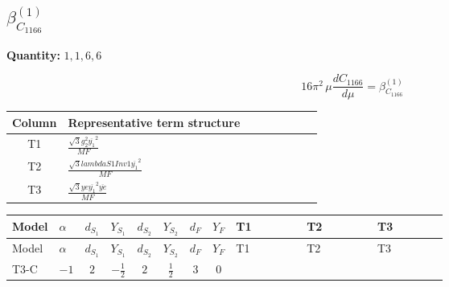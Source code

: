 \documentclass[8pt]{article}
\begin{document}
\begin{landscape}
\section*{$\beta_{C_{1166}}^{(1)}$}
\noindent\textbf{Quantity: }$\mathrm{1,1,6,6}$\par\smallskip
\[16\pi^2\,\mu\frac{d C_{1166}}{d\mu}=\beta_{C_{1166}}^{(1)}\]
\begin{center}
\begin{tabular}{@{}c >{\raggedright\arraybackslash}p{0.82\linewidth}@{}}
\toprule
Column & Representative term structure \\
\midrule
T1 & \(\displaystyle \frac{\sqrt{3} g_{2}^{2} \overline{y_{1}}^{2}}{MF}\) \\
\midrule
T2 & \(\displaystyle \frac{\sqrt{3} lambdaS1Inv1 \overline{y_{1}}^{2}}{MF}\) \\
\midrule
T3 & \(\displaystyle \frac{\sqrt{3} ye \overline{y_{1}}^{2} \overline{ye}}{MF}\) \\
\midrule
\bottomrule
\end{tabular}
\end{center}
\smallskip
\tiny
\begin{longtable}{@{}llcccccc >{\raggedright\arraybackslash}p{0.21\linewidth} >{\raggedright\arraybackslash}p{0.21\linewidth} >{\raggedright\arraybackslash}p{0.21\linewidth}@{}}
\toprule
Model & $\alpha$ & $d_{S_1}$ & $Y_{S_1}$ & $d_{S_2}$ & $Y_{S_2}$ & $d_F$ & $Y_F$ & T1 & T2 & T3 \\
\midrule
\endfirsthead
\toprule
Model & $\alpha$ & $d_{S_1}$ & $Y_{S_1}$ & $d_{S_2}$ & $Y_{S_2}$ & $d_F$ & $Y_F$ & T1 & T2 & T3 \\
\midrule
\endhead
T3-C & $-1$ & $2$ & $-\frac{1}{2}$ & $2$ & $\frac{1}{2}$ & $3$ & $0$ & \scriptsize\adjustbox{max width=\linewidth}{$\begin{gathered} \frac{\sqrt{3} g_{2}^{2} \overline{y_{1}}^{2}}{4 MF}\end{gathered}$} & \scriptsize\adjustbox{max width=\linewidth}{$\begin{gathered} \frac{\sqrt{3} lambdaS1Inv1 \overline{y_{1}}^{2}}{6 MF}\end{gathered}$} & \scriptsize\adjustbox{max width=\linewidth}{$\begin{gathered} - \frac{\sqrt{3} ye \overline{y_{1}}^{2} \overline{ye}}{12 MF}\end{gathered}$} \\
\midrule
\bottomrule
\end{longtable}
\clearpage

\end{landscape}
\end{document}
